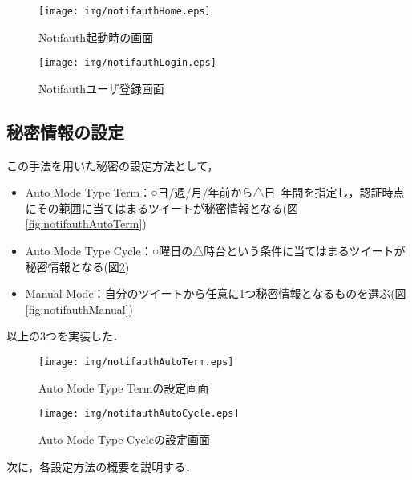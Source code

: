 \begin{figure}[ht]
\begin{minipage}{0.5\hsize}
\begin{center}
\texttt{[image: img/notifauthHome.eps]}
\end{center}
\caption{Notifauth起動時の画面}
\label{fig:notifauthHome}
\end{minipage}
\begin{minipage}{0.5\hsize}
\begin{center}
\texttt{[image: img/notifauthLogin.eps]}
\end{center}
\caption{Notifauthユーザ登録画面}
\label{fig:notifauthLogin}
\end{minipage}
\end{figure}

\subsection{秘密情報の設定}
この手法を用いた秘密の設定方法として，
\begin{itemize}
\item Auto Mode Type Term：○日/週/月/年前から△日~年間を指定し，認証時点にその範囲に当てはまるツイートが秘密情報となる(図\ref{fig:notifauthAutoTerm})
\item Auto Mode Type Cycle：○曜日の△時台という条件に当てはまるツイートが秘密情報となる(図\ref{fig:notifauthAutoCycle})
\item Manual Mode：自分のツイートから任意に1つ秘密情報となるものを選ぶ(図\ref{fig:notifauthManual})
\end{itemize}
以上の3つを実装した．

\begin{figure}[ht]
\begin{minipage}{0.5\hsize}
\begin{center}
\texttt{[image: img/notifauthAutoTerm.eps]}
\end{center}
\caption{Auto Mode Type Termの設定画面}
\label{fig:notifauthAutoTerm}
\end{minipage}
\begin{minipage}{0.5\hsize}
\begin{center}
\texttt{[image: img/notifauthAutoCycle.eps]}
\end{center}
\caption{Auto Mode Type Cycleの設定画面}
\label{fig:notifauthAutoCycle}
\end{minipage}
\end{figure}

次に，各設定方法の概要を説明する．

